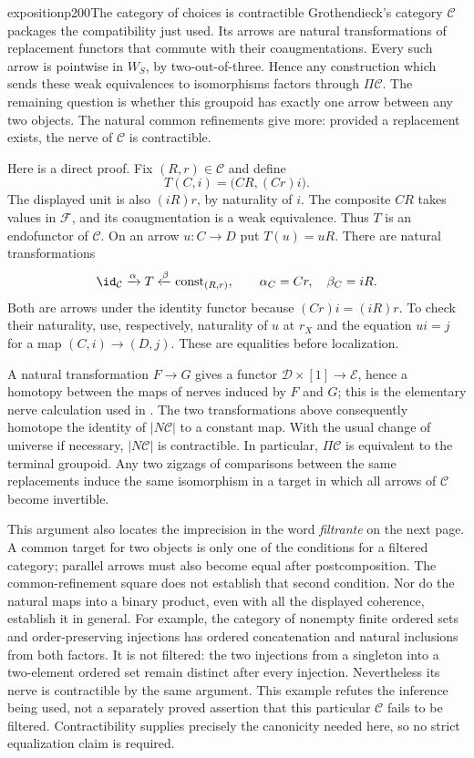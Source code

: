 \begin{dcomment}{exposition}{p200}{The category of choices is contractible}
Grothendieck's category $\mathcal C$ packages the compatibility just used. Its arrows are natural transformations of replacement functors that commute with their coaugmentations. Every such arrow is pointwise in $W_S$, by two-out-of-three. Hence any construction which sends these weak equivalences to isomorphisms factors through $\Pi\mathcal C$. The remaining question is whether this groupoid has exactly one arrow between any two objects. The natural common refinements give more: provided a replacement exists, the nerve of $\mathcal C$ is contractible.

Here is a direct proof. Fix $(R,r)\in\mathcal C$ and define
\[
 T(C,i)=\bigl(CR,(Cr)i\bigr).
\]
The displayed unit is also $(iR)r$, by naturality of $i$. The composite $CR$ takes values in $\mathcal F$, and its coaugmentation is a weak equivalence. Thus $T$ is an endofunctor of $\mathcal C$. On an arrow $u:C\to D$ put $T(u)=uR$. There are natural transformations
\[
 \id_{\mathcal C}\xrightarrow{\alpha}T
       \xleftarrow{\beta}\operatorname{const}_{(R,r)},
 \qquad \alpha_C=Cr,\quad\beta_C=iR.
\]
Both are arrows under the identity functor because $(Cr)i=(iR)r$. To check their naturality, use, respectively, naturality of $u$ at $r_X$ and the equation $ui=j$ for a map $(C,i)\to(D,j)$. These are equalities before localization.

A natural transformation $F\to G$ gives a functor $\mathcal D\times[1]\to\mathcal E$, hence a homotopy between the maps of nerves induced by $F$ and $G$; this is the elementary nerve calculation used in \citet[\S1, Proposition~2]{Quillen1973}. The two transformations above consequently homotope the identity of $|N\mathcal C|$ to a constant map. With the usual change of universe if necessary, $|N\mathcal C|$ is contractible. In particular, $\Pi\mathcal C$ is equivalent to the terminal groupoid. Any two zigzags of comparisons between the same replacements induce the same isomorphism in a target in which all arrows of $\mathcal C$ become invertible.

This argument also locates the imprecision in the word \emph{filtrante} on the next page. A common target for two objects is only one of the conditions for a filtered category; parallel arrows must also become equal after postcomposition. The common-refinement square does not establish that second condition. Nor do the natural maps into a binary product, even with all the displayed coherence, establish it in general. For example, the category of nonempty finite ordered sets and order-preserving injections has ordered concatenation and natural inclusions from both factors. It is not filtered: the two injections from a singleton into a two-element ordered set remain distinct after every injection. Nevertheless its nerve is contractible by the same argument. This example refutes the inference being used, not a separately proved assertion that this particular $\mathcal C$ fails to be filtered. Contractibility supplies precisely the canonicity needed here, so no strict equalization claim is required.
\end{dcomment}

